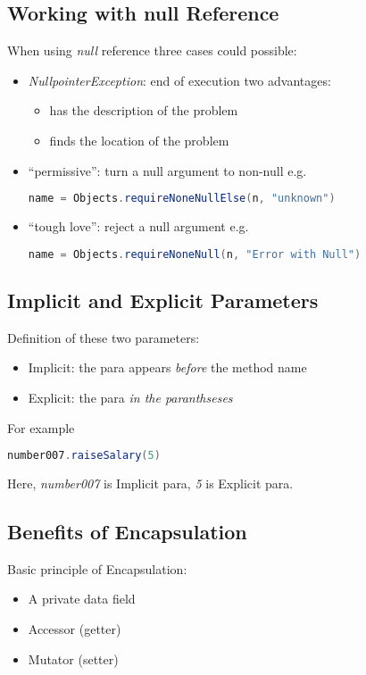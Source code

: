 \documentclass[12pt]{article}
\begin{document}
\subsection{Working with null Reference}
When using \emph{null} reference three cases could possible:
\begin{itemize}
    \item \textit{NullpointerException}: end of execution\newline
    two advantages:
    \begin{itemize}
        \item has the description of the problem
        \item finds the location of the problem
    \end{itemize}
    \item ``permissive'': turn a null argument to non-null\newline
    e.g.
    \begin{lstlisting}[language=Java]
    name = Objects.requireNoneNullElse(n, "unknown")
    \end{lstlisting}
    \item ``tough love'': reject a null argument\newline
    e.g.
    \begin{lstlisting}[language=Java]
    name = Objects.requireNoneNull(n, "Error with Null")
    \end{lstlisting}
\end{itemize}

\subsection{Implicit and Explicit Parameters}
Definition of these two parameters:
\begin{itemize}
    \item Implicit: the para appears \textit{before} the method name
    \item Explicit: the para \textit{in the paranthseses}
\end{itemize}
For example
\begin{lstlisting}[language=Java]
    number007.raiseSalary(5)
\end{lstlisting}
Here, \emph{number007} is Implicit para, \emph{5} is Explicit para.

\subsection{Benefits of Encapsulation}
Basic principle of Encapsulation:
\begin{itemize}
    \item A private data field
    \item Accessor (getter)
    \item Mutator (setter)
\end{itemize}
\end{document}

